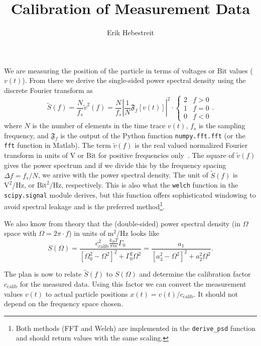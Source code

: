 \documentclass[10pt,a4paper]{article}
\author{Erik Hebestreit}
\title{Calibration of Measurement Data}
\begin{document}
	\maketitle
	
	We are measuring the position of the particle in terms of voltages or Bit values ($v(t)$). From there we derive the single-sided power spectral density using the discrete Fourier transform as
	\begin{equation}
		\tilde{S}(f)=\frac{N}{f_s}\tilde{v}^2(f)=\frac{N}{f_s}\left|\frac{1}{N}\mathfrak{F}_f[v(t)]\right|^2\cdot\begin{cases}
		2 & f>0\\
		1 & f=0\\
		0 & f<0
		\end{cases}.
	\end{equation}
	where $N$ is the number of elements in the time trace $v(t)$, $f_s$ is the sampling frequency, and $\mathfrak{F}_f$ is the output of the Python function \texttt{numpy.fft.fft} (or the \texttt{fft} function in Matlab). The term $\tilde{v}(f)$ is the real valued normalized Fourier transform in units of $\mathrm{V}$ or $\mathrm{Bit}$ for positive frequencies only~\cite{Gehrcke2009}. The square of $\tilde{v}(f)$ gives the power spectrum and if we divide this by the frequency spacing $\Delta f=f_s/N$, we arrive with the power spectral density. The unit of $\tilde{S}(f)$ is $\mathrm{V}^2/\mathrm{Hz}$, or $\mathrm{Bit}^2/\mathrm{Hz}$, respectively. This is also what the \texttt{welch} function in the \texttt{scipy.signal} module derives, but this function offers sophisticated windowing to avoid spectral leakage and is the preferred method\footnote{Both methods (FFT and Welch) are implemented in the \texttt{derive\_psd} function and should return values with the same scaling.}.
	
	We also know from theory that the (double-sided) power spectral density (in $\Omega$ space with $\Omega=2\pi\cdot f$) in units of $\mathrm{m}^2/\mathrm{Hz}$ looks like~\cite{Gieseler2014}
	\begin{equation}\label{eq:psd_omega}
		S(\Omega)=\frac{c_\text{calib}^2\frac{k_BT}{\pi m}\Gamma_0}{[\Omega_0^2-\Omega^2]^2+\Gamma_0^2\Omega^2} = \frac{a_1}{[a_3^2-\Omega^2]^2+a_2^2\Omega^2}.
	\end{equation}
	
	The plan is now to relate $\tilde{S}(f)$ to $S(\Omega)$ and determine the calibration factor $c_\text{calib}$ for the measured data. Using this factor we can convert the measurement values $v(t)$ to actual particle positions $x(t)=v(t)/c_\text{calib}$. It should not depend on the frequency space chosen.
	
\end{document}
